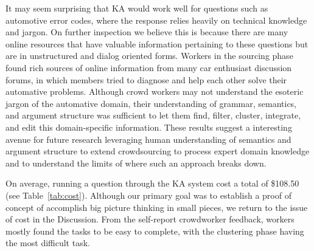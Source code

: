 It may seem surprising that KA would work well for questions such as automotive error codes, where the response relies heavily on technical knowledge and jargon. On further inspection we believe this is because there are many online resources that have valuable information pertaining to these questions but are in unstructured and dialog oriented forms. Workers in the sourcing phase found rich sources of online information from many car enthusiast discussion forums, in which members tried to diagnose and help each other solve their automative problems. Although crowd workers may not understand the esoteric jargon of the automative domain, their understanding of grammar, semantics, and argument structure was sufficient to let them find, filter, cluster, integrate, and edit this domain-specific information. These results suggest a interesting avenue for future research leveraging human understanding of semantics and argument structure to extend crowdsourcing to process expert domain knowledge and to understand the limits of where such an approach breaks down.


On average, running a question through the KA system cost a total of \$108.50 (see Table~\ref{tab:cost}). Although our primary goal was to establish a proof of concept of accomplish big picture thinking in small pieces, we return to the issue of cost in the Discussion. From the self-report crowdworker feedback, workers mostly found the tasks to be easy to complete, with the clustering phase having the most difficult task.

